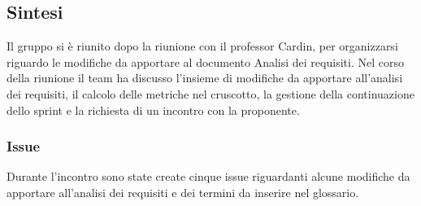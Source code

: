\documentclass[10pt]{article}
\begin{document}
\subsection{Sintesi}
Il gruppo si è riunito dopo la riunione con il professor Cardin, per organizzarsi riguardo le modifiche da apportare al documento Analisi dei requisiti.
Nel corso della riunione il team ha discusso l'insieme di modifiche da apportare all'analisi dei requisiti, il calcolo delle metriche nel cruscotto, la gestione della continuazione dello sprint e la richiesta di un incontro con la proponente.

\subsubsection{Issue}
Durante l'incontro sono state create cinque issue riguardanti alcune modifiche da apportare all'analisi dei requisiti e dei termini da inserire nel glossario.
\end{document}
